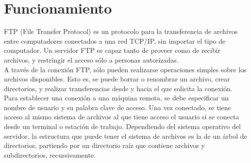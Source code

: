 \section{Funcionamiento}

FTP (File Transfer Protocol) es un protocolo para la transferencia de archivos entre computadores conectados a una red TCP/IP, sin importar el tipo de computador. Un servidor FTP es capaz tanto de proveer como de recibir archivos, y restringir el acceso sólo a personas autorizadas.\\[10pt]
A través de la conexión FTP, sólo pueden realizarse operaciones simples sobre los archivos disponibles. Esto es, se puede borrar o renombrar un archivo, crear directorios, y realizar transferencias desde y hacia el que solicita la conexión.\\[10pt]
Para establecer una conexión a una máquina remota, se debe especificar un nombre de usuario y su palabra clave de acceso. Una vez conectado, se tiene acceso al mismo sistema de archivos al que tiene acceso el usuario si se conecta desde un terminal o estación de trabajo. Dependiendo del sistema operativo del servidor, la estructura que puede tener el sistema de archivos es la de un árbol de directorios, partiendo por un directorio raíz que contiene archivos y subdirectorios, recursivamente.\\[10pt]
